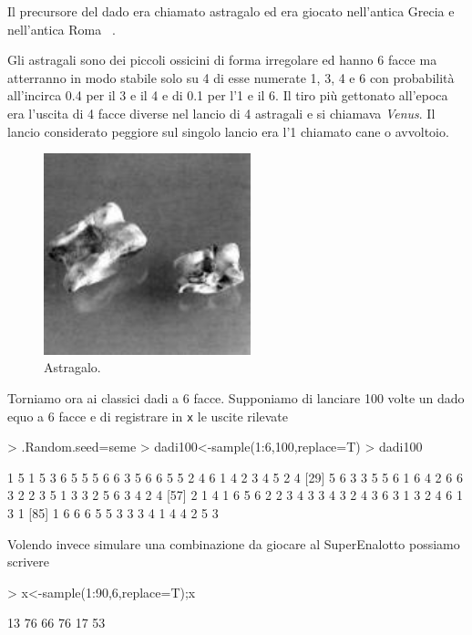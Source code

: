 \documentclass[onecolumn,11pt]{book}
\begin{document}
Il precursore  del dado era chiamato astragalo ed era giocato nell'antica Grecia e nell'antica Roma
~\cite{david}.
  
 Gli  astragali sono dei piccoli ossicini di forma irregolare ed hanno 6 facce ma atterranno in  modo stabile solo su 4 di esse numerate 1, 3, 4 e 6  con probabilit\`a all'incirca 0.4 per il 3 e il 4  e di 0.1 per l'1 e il 6.
Il tiro pi\`u gettonato all'epoca era l'uscita di 4 facce diverse nel lancio di 4 astragali e si chiamava {\it Venus}.
Il lancio considerato peggiore sul singolo lancio era l'1 chiamato cane o avvoltoio.
\begin{figure}[htbp]
\begin{center}
\includegraphics[width=6cm]{../grafici/astragals.jpeg}
\caption{ Astragalo. }
\label{fig:daiist}
\end{center}
\end{figure}
Torniamo ora ai classici dadi a 6 facce.
Supponiamo di lanciare 100 volte un dado equo a 6 facce e di registrare in \texttt{x}
le uscite rilevate 
\begin{Schunk}
\begin{Sinput}
> .Random.seed=seme
> dadi100<-sample(1:6,100,replace=T)
> dadi100
\end{Sinput}
\begin{Soutput}
  [1] 1 5 1 5 3 6 5 5 5 6 6 3 5 6 6 5 5 2 4 6 1 4 2 3 4 5 2 4
 [29] 5 6 3 3 5 5 6 1 6 4 2 6 6 3 2 2 3 5 1 3 3 2 5 6 3 4 2 4
 [57] 2 1 4 1 6 5 6 2 2 3 4 3 3 4 3 2 4 3 6 3 1 3 2 4 6 1 3 1
 [85] 1 6 6 6 5 5 3 3 3 4 1 4 4 2 5 3
\end{Soutput}
\end{Schunk}
Volendo invece simulare una combinazione da giocare al SuperEnalotto possiamo scrivere
\begin{Schunk}
\begin{Sinput}
> x<-sample(1:90,6,replace=T);x
\end{Sinput}
\begin{Soutput}
[1] 13 76 66 76 17 53
\end{Soutput}
\end{Schunk}
\end{document}
